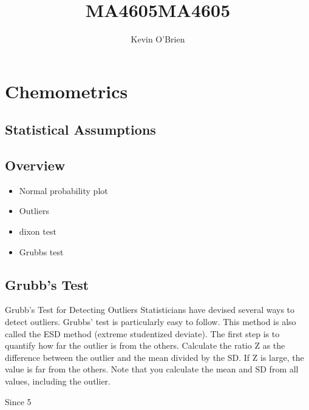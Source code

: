 \documentclass[12pt, a4paper]{report}
\title{MA4605}
\author{ } \date{ }
\theoremstyle{plain}
\theoremstyle{definition}
\theoremstyle{remark}
\begin{document}
\author{Kevin O'Brien}
\title{MA4605}

\tableofcontents \setcounter{tocdepth}{2}

\chapter{Chemometrics}


\section{Statistical Assumptions}

\section{Overview}

\begin{itemize}
\item Normal probability plot \item Outliers \item dixon test
\item Grubbs test
\end{itemize}

\section{Grubb's Test}

Grubb's Test for Detecting Outliers
Statisticians have devised several ways to detect outliers. Grubbs' test is particularly easy to follow. This method is also called the ESD method (extreme studentized deviate).
The first step is to quantify how far the outlier is from the others. Calculate the ratio Z as the difference between the outlier and the mean divided by the SD. If Z is large, the value is far from the others. Note that you calculate the mean and SD from all values, including the outlier.



Since 5%
\end{document}
